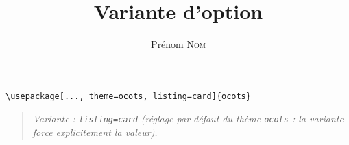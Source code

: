 \documentclass[11pt]{ocots-book}
\title{Variante d'option}
\author{Prénom \textsc{Nom}}
\newcommand{\ocotsvariantnote}[1]{\begin{quote}\itshape Variante : #1\end{quote}}
\begin{document}
\maketitle

\begin{lstlisting}
\usepackage[..., theme=ocots, listing=card]{ocots}
\end{lstlisting}
\ocotsvariantnote{\texttt{listing=card} (r\'eglage par d\'efaut du th\`eme \texttt{ocots} : la variante force explicitement la valeur).}

\end{document}
